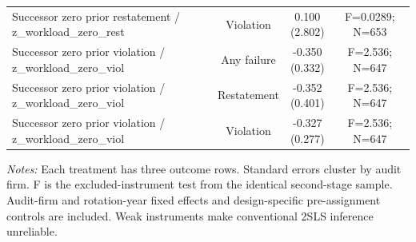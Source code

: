 \documentclass[10pt]{article}
\begin{document}
\begin{minipage}{19cm}
\begin{threeparttable}
\begin{tabular}{p{}ccc}
Successor zero prior restatement / z\_workload\_zero\_rest & Violation & \shortstack{0.100\\(2.802)} & F=0.0289; N=653 \\
Successor zero prior violation / z\_workload\_zero\_viol & Any failure & \shortstack{-0.350\\(0.332)} & F=2.536; N=647 \\
Successor zero prior violation / z\_workload\_zero\_viol & Restatement & \shortstack{-0.352\\(0.401)} & F=2.536; N=647 \\
Successor zero prior violation / z\_workload\_zero\_viol & Violation & \shortstack{-0.327\\(0.277)} & F=2.536; N=647 \\
\bottomrule
\end{tabular}
\begin{tablenotes}\fontsize{9}{11}\selectfont
\item \raggedright \fontsize{9}{11}\selectfont \textit{Notes:} Each treatment has three outcome rows. Standard errors cluster by audit firm. F is the excluded-instrument test from the identical second-stage sample. Audit-firm and rotation-year fixed effects and design-specific pre-assignment controls are included. Weak instruments make conventional 2SLS inference unreliable.
\end{tablenotes}
\end{threeparttable}

\end{minipage}
\end{document}

